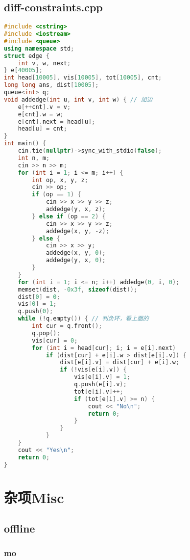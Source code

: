 \documentclass[9pt, a4paper, oneside]{book}
\begin{document}
\section{diff-constraints.cpp}
\begin{lstlisting}[language={C++}]
#include <cstring>
#include <iostream>
#include <queue>
using namespace std;
struct edge {
    int v, w, next;
} e[40005];
int head[10005], vis[10005], tot[10005], cnt;
long long ans, dist[10005];
queue<int> q;
void addedge(int u, int v, int w) { // 加边
    e[++cnt].v = v;
    e[cnt].w = w;
    e[cnt].next = head[u];
    head[u] = cnt;
}
int main() {
    cin.tie(nullptr)->sync_with_stdio(false);
    int n, m;
    cin >> n >> m;
    for (int i = 1; i <= m; i++) {
        int op, x, y, z;
        cin >> op;
        if (op == 1) {
            cin >> x >> y >> z;
            addedge(y, x, z);
        } else if (op == 2) {
            cin >> x >> y >> z;
            addedge(x, y, -z);
        } else {
            cin >> x >> y;
            addedge(x, y, 0);
            addedge(y, x, 0);
        }
    }
    for (int i = 1; i <= n; i++) addedge(0, i, 0);
    memset(dist, -0x3f, sizeof(dist));
    dist[0] = 0;
    vis[0] = 1;
    q.push(0);
    while (!q.empty()) { // 判负环，看上面的
        int cur = q.front();
        q.pop();
        vis[cur] = 0;
        for (int i = head[cur]; i; i = e[i].next)
            if (dist[cur] + e[i].w > dist[e[i].v]) {
                dist[e[i].v] = dist[cur] + e[i].w;
                if (!vis[e[i].v]) {
                    vis[e[i].v] = 1;
                    q.push(e[i].v);
                    tot[e[i].v]++;
                    if (tot[e[i].v] >= n) {
                        cout << "No\n";
                        return 0;
                    }
                }
            }
    }
    cout << "Yes\n";
    return 0;
}\end{lstlisting}
\chapter{杂项Misc}
\section{offline}
\subsection{mo}
\end{document}

